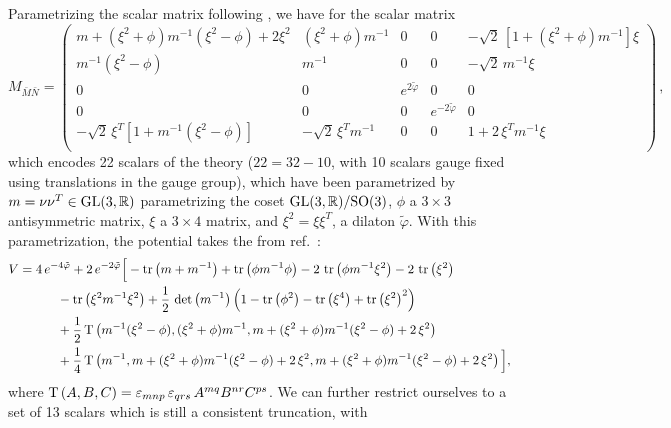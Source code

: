 \documentclass[11pt]{article}
\newcommand{\bM}{{\bar{M}}}
\newcommand{\bN}{{\bar{N}}}
\begin{document}
Parametrizing the scalar matrix following \cite{Eloy:2021fhc}, we have for the scalar matrix 
\begin{equation}	\label{eq: scalarmatrix}
	M_{\bM\bN}
	=
	\begin{pmatrix}
		m+(\xi^2+\phi)m^{-1}(\xi^2-\phi)+2\xi^2	& 	(\xi^2+\phi)m^{-1}		&	0	&  0  &	-\sqrt2\,[1+(\xi^2+\phi)m^{-1}]\xi	\\
		m^{-1}(\xi^2-\phi)	& 	m^{-1}	&	0  	&  0  &	-\sqrt2\,m^{-1}\xi	\\
		0		&	0		&	e^{2\tilde\varphi}	&	0				&	0		\\
		0		&	0		&	0				&	e^{-2\tilde\varphi}	&	0		\\
		-\sqrt2\,\xi^T[1+m^{-1}(\xi^2-\phi)]	&	-\sqrt2\,\xi^Tm^{-1}	&	0	&	0	&	1+2\,\xi^Tm^{-1}\xi	\\
	\end{pmatrix}\,,
\end{equation}
which encodes 22 scalars of the theory ($22 = 32 - 10$, with 10 scalars gauge fixed using translations in the gauge group), which have been parametrized by 
$m = \nu\nu^{T}\in{\rm GL}(3,\mathbb{R})$ parametrizing the coset ${\rm GL}(3,\mathbb{R})/{\rm SO}(3)$, $\phi$ a $3\times3$ antisymmetric matrix, $\xi$ a $3\times4$ matrix, and $\xi^{2} = \xi \xi^{T}$, a dilaton $\tilde{\varphi}$. With this parametrization, the potential takes the from ref.~\cite{Eloy:2021fhc}:
\begin{equation} \label{eq:scalarpotential}
	\begin{aligned}
		V & = 4\,e^{-4\tilde\varphi}+2\,e^{-2\tilde\varphi}\Big[-\tr\left(m+m^{-1}\right)+\tr\left(\phi m^{-1}\phi\right) -2\,\tr\left(\phi m^{-1}\xi^{2}\right)-2\,\tr\left(\xi^{2}\right)\\
		&\qquad\quad-\tr\left(\xi^{2}m^{-1}\xi^{2}\right)  +\frac{1}{2}\,\det\left(m^{-1}\right)\left(1-\tr\left(\phi^{2}\right)-\tr\left(\xi^{4}\right)+\tr\left(\xi^{2}\right)^{2}\right) \\
		&\qquad\quad +\frac{1}{2}\,{\rm T}\left(m^{-1}(\xi^{2}-\phi),(\xi^{2}+\phi)m^{-1},m+(\xi^{2}+\phi)m^{-1}(\xi^{2}-\phi)+2\,\xi^{2}\right)\\
		&\qquad\quad +\frac{1}{4}\,{\rm T}\left(m^{-1},m+(\xi^{2}+\phi)m^{-1}(\xi^{2}-\phi)+2\,\xi^{2},m+(\xi^{2}+\phi)m^{-1}(\xi^{2}-\phi)+2\,\xi^{2}\right)\Big], 
	\end{aligned}
\end{equation}
where ${\rm T}\left(A,B,C\right)=\varepsilon_{mnp}\,\varepsilon_{qrs}\,A^{mq}B^{nr}C^{ps}$. We can further restrict ourselves to a set of 13 scalars which is still a consistent truncation, with 
\end{document}
